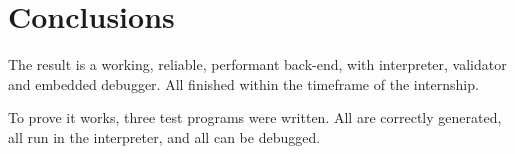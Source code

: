 \section{Conclusions}
The result is a working, reliable, performant back-end, with interpreter, validator and embedded debugger.
All finished within the timeframe of the internship.

To prove it works, three test programs were written.
All are correctly generated, all run in the interpreter, and all can be debugged.

